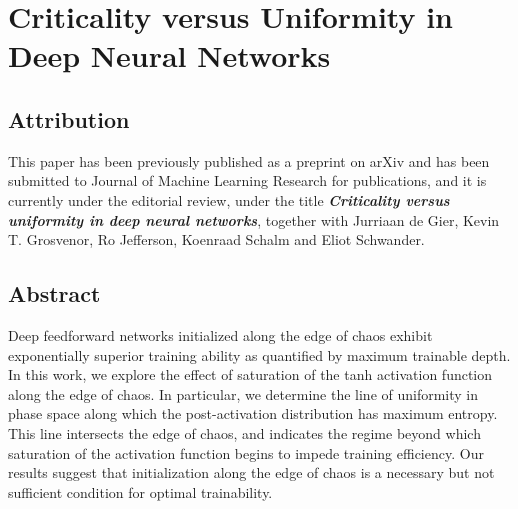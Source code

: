 \chapter{Criticality versus Uniformity in Deep Neural Networks}
\label{ch:edgeofchaos}

\section*{Attribution}
This paper has been previously published as a preprint on arXiv and has been submitted to Journal of Machine Learning Research for publications, and it is currently under the editorial review, under the title \textbf{\textit{Criticality versus uniformity in deep neural networks}}, together with Jurriaan de Gier,  Kevin T. Grosvenor, Ro Jefferson, Koenraad Schalm and Eliot Schwander.\cite{bukva2023criticality}

\section*{Abstract}
Deep feedforward networks initialized along the edge of chaos exhibit exponentially superior training ability as quantified by maximum trainable depth. In this work, we explore the effect of saturation of the tanh activation function along the edge of chaos. In particular, we determine the line of uniformity in phase space along which the post-activation distribution has maximum entropy. This line intersects the edge of chaos, and indicates the regime beyond which saturation of the activation function begins to impede training efficiency. Our results suggest that initialization along the edge of chaos is a necessary but not sufficient condition for optimal trainability.

